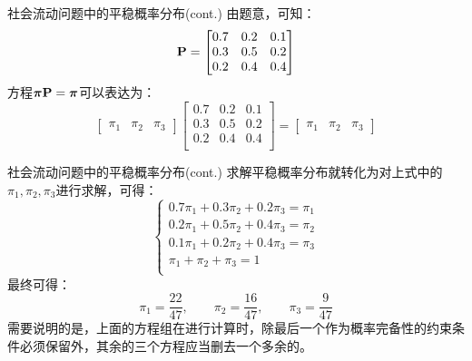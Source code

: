 \documentclass[t]{beamer}
\begin{document}
\begin{frame}{社会流动问题中的平稳概率分布(cont.)}
    由题意，可知：
    \[{\bf P}=	
            \begin{bmatrix}
    0.7   &   0.2           & 0.1\\
        0.3     &      0.5   &   0.2 \\
        0.2   &   0.4 &          0.4 \\
            \end{bmatrix} 
    \]
    方程$\bm{\pi}{\bf P}=\bm{\pi}$可以表达为：
    \[\begin{bmatrix}
    \pi_1&\pi_2&\pi_3
    \end{bmatrix}\begin{bmatrix}
    0.7   &   0.2           & 0.1\\
    0.3     &      0.5   &   0.2 \\
    0.2   &   0.4 &          0.4 \\
    \end{bmatrix}=\begin{bmatrix}
    \pi_1&\pi_2&\pi_3
    \end{bmatrix} \]
\end{frame}

\begin{frame}{社会流动问题中的平稳概率分布(cont.)}
    求解平稳概率分布就转化为对上式中的$\pi_1, \pi_2, \pi_3$进行求解，可得：
    \[\begin{cases}
    0.7\pi_1+0.3\pi_2+0.2\pi_3=\pi_1\\
    0.2\pi_1+0.5\pi_2+0.4\pi_3=\pi_2\\
    0.1\pi_1+0.2\pi_2+0.4\pi_3=\pi_3 \\
    \pi_1+\pi_2+\pi_3=1\\
    \end{cases} \]
    最终可得：$$\pi_1=\frac{22}{47},\qquad \pi_2=\frac{16}{47},\qquad \pi_3=\frac{9}{47}$$
    需要说明的是，上面的方程组在进行计算时，除最后一个作为概率完备性的约束条件必须保留外，其余的三个方程应当删去一个多余的。
\end{frame}
\end{document}
